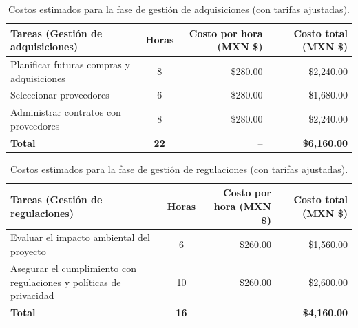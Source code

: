 \begin{table}[H]
	\centering
	\renewcommand{\arraystretch}{1.6}
	\setlength{\tabcolsep}{10pt}
	\Huge
	\begin{adjustbox}{max width=\textwidth}
		\begin{tabular}{|p{9.5cm}|c|r|r|}
			\hline
			\textbf{Tareas (Gestión de adquisiciones)} & \textbf{Horas} & \textbf{Costo por hora (MXN \$)} & \textbf{Costo total (MXN \$)} \\ \hline
			Planificar futuras compras y adquisiciones & 8 & \$280.00 & \$2,240.00 \\ \hline
			Seleccionar proveedores & 6 & \$280.00 & \$1,680.00 \\ \hline
			Administrar contratos con proveedores & 8 & \$280.00 & \$2,240.00 \\ \hline
			\textbf{Total} & \textbf{22} & -- & \textbf{\$6,160.00} \\ \hline
		\end{tabular}
	\end{adjustbox}
	\caption{Costos estimados para la fase de gestión de adquisiciones (con tarifas ajustadas).}
	\label{tab:costos_adquisiciones_actualizado}
\end{table}

\begin{table}[H]
	\centering
	\renewcommand{\arraystretch}{1.6}
	\setlength{\tabcolsep}{10pt}
	\Huge
	\begin{adjustbox}{max width=\textwidth}
		\begin{tabular}{|p{9.5cm}|c|r|r|}
			\hline
			\textbf{Tareas (Gestión de regulaciones)} & \textbf{Horas} & \textbf{Costo por hora (MXN \$)} & \textbf{Costo total (MXN \$)} \\ \hline
			Evaluar el impacto ambiental del proyecto & 6 & \$260.00 & \$1,560.00 \\ \hline
			Asegurar el cumplimiento con regulaciones y políticas de privacidad & 10 & \$260.00 & \$2,600.00 \\ \hline
			\textbf{Total} & \textbf{16} & -- & \textbf{\$4,160.00} \\ \hline
		\end{tabular}
	\end{adjustbox}
	\caption{Costos estimados para la fase de gestión de regulaciones (con tarifas ajustadas).}
	\label{tab:costos_regulaciones_actualizado}
\end{table}

